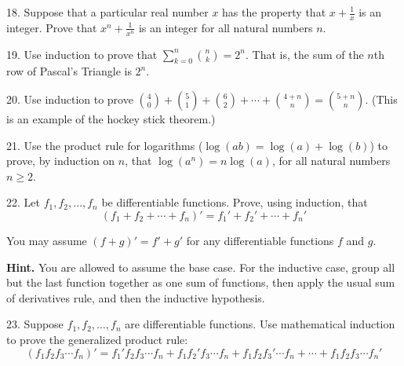 \documentclass[10pt,]{book}
\theoremstyle{plain}
\theoremstyle{definition}
\theoremstyle{definition}
\theoremstyle{definition}
\theoremstyle{definition}
\numberwithin{equation}{chapter}
\renewcommand{\d}{\displaystyle}
\begin{document}
\begin{exerciselist}
\par\smallskip
\item[18.]\hypertarget{exercise-62}{}\hypertarget{p-500}{}%
Suppose that a particular real number \(x\) has the property that \(x + \frac{1}{x}\) is an integer. Prove that \(x^n + \frac{1}{x^n}\) is an integer for all natural numbers \(n\).%
\par\smallskip
\item[19.]\hypertarget{exercise-63}{}\hypertarget{p-503}{}%
Use induction to prove that \(\d\sum_{k=0}^n {n \choose k} = 2^n\). That is, the sum of the \(n\)th row of Pascal's Triangle is \(2^n\).%
\par\smallskip
\item[20.]\hypertarget{exercise-64}{}\hypertarget{p-504}{}%
Use induction to prove \({4 \choose 0} + {5 \choose 1} + {6 \choose 2} + \cdots + {4+n \choose n} = {5+n \choose n}\). (This is an example of the hockey stick theorem.)%
\par\smallskip
\item[21.]\hypertarget{exercise-65}{}\hypertarget{p-505}{}%
Use the product rule for logarithms (\(\log(ab) = \log(a) + \log(b)\)) to prove, by induction on \(n\), that \(\log(a^n) = n \log(a)\), for all natural numbers \(n \ge 2\).%
\par\smallskip
\item[22.]\hypertarget{exercise-66}{}\hypertarget{p-508}{}%
Let \(f_1, f_2,\ldots, f_n\) be differentiable functions. Prove, using induction, that%
\begin{equation*}
(f_1 + f_2 + \cdots + f_n)' = f_1' + f_2' + \cdots + f_n'
\end{equation*}
%
\par
\hypertarget{p-509}{}%
You may assume \((f+g)' = f' + g'\) for any differentiable functions \(f\) and \(g\).%
\par\smallskip
\par\smallskip%
\noindent\textbf{Hint.}\hypertarget{hint-1}{}\quad%
\hypertarget{p-510}{}%
You are allowed to assume the base case. For the inductive case, group all but the last function together as one sum of functions, then apply the usual sum of derivatives rule, and then the inductive hypothesis.%
\item[23.]\hypertarget{exercise-67}{}\hypertarget{p-511}{}%
Suppose \(f_1, f_2, \ldots, f_n\) are differentiable functions. Use mathematical induction to prove the generalized product rule:%
\begin{equation*}
(f_1 f_2 f_3 \cdots f_n)' = f_1' f_2 f_3 \cdots f_n + f_1 f_2' f_3 \cdots f_n + f_1 f_2 f_3' \cdots f_n + \cdots + f_1 f_2 f_3 \cdots f_n'

\end{equation*}
\end{exerciselist}
\end{document}

